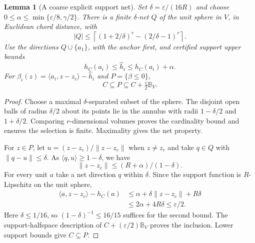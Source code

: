 \documentclass[10pt,letterpaper]{article}
\newtheorem{lemma}{Lemma}
\theoremstyle{remark}
\newcommand{\ball}{\mathbb B_V}
\begin{document}
\begin{lemma}[A coarse explicit support net]\label{lem:net}
Set $\delta=\varepsilon/(16R)$ and choose
$0\leq\alpha\leq\min\{\varepsilon/8,\gamma/2\}$.
There is a finite $\delta$-net $Q$ of the unit sphere in $V$, in Euclidean chord distance, with
\[
 |Q|\leq\left\lceil(1+2/\delta)^r-(2/\delta-1)^r\right\rceil.
\]
Use the directions $Q\cup\{a_1\}$, with the anchor first, and certified support upper bounds
\[
 h_C(a_i)\leq\widehat h_i\leq h_C(a_i)+\alpha.
\]
For $\beta_i(z)=\langle a_i,z-z_c\rangle-\widehat h_i$ and $P=\{\beta\leq0\}$,
\[
 C\subseteq P\subseteq C+\tfrac{\varepsilon}{2}\ball.
\]
\end{lemma}
\begin{proof}
Choose a maximal $\delta$-separated subset of the sphere. The disjoint open balls of radius $\delta/2$ about its points lie in the annulus with radii $1-\delta/2$ and $1+\delta/2$. Comparing $r$-dimensional volumes proves the cardinality bound and ensures the selection is finite. Maximality gives the net property.

For $z\in P$, let $u=(z-z_c)/\|z-z_c\|$ when $z\neq z_c$ and take $q\in Q$ with $\|q-u\|\leq\delta$. As $\langle q,u\rangle\geq1-\delta$, we have
\[
 \|z-z_c\|\leq (R+\alpha)/(1-\delta).
\]
For every unit $a$ take a net direction $q$ within $\delta$. Since the support function is $R$-Lipschitz on the unit sphere,
\begin{align*}
 \langle a,z-z_c\rangle-h_C(a)
 &\leq\alpha+\delta\|z-z_c\|+R\delta\\
 &\leq 2\alpha+4R\delta\leq\varepsilon/2.
\end{align*}
Here $\delta\leq1/16$, so $(1-\delta)^{-1}\leq16/15$ suffices for the second bound. The support-halfspace description of $C+(\varepsilon/2)\ball$ proves the inclusion. Lower support bounds give $C\subseteq P$.
\end{proof}
\end{document}

